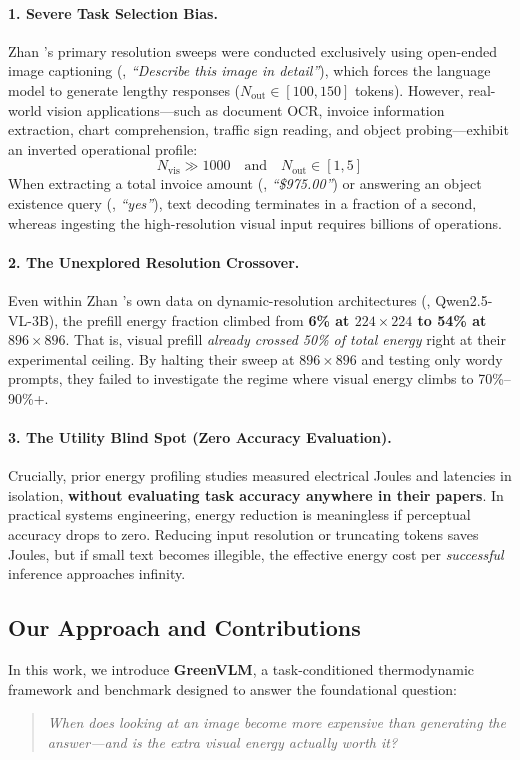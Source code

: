 \paragraph{1. Severe Task Selection Bias.}
Zhan \etal's primary resolution sweeps were conducted exclusively using open-ended image captioning (\eg, \emph{``Describe this image in detail''}), which forces the language model to generate lengthy responses ($N_{\text{out}} \in [100, 150]$ tokens). However, real-world vision applications---such as document OCR, invoice information extraction, chart comprehension, traffic sign reading, and object probing---exhibit an inverted operational profile:
\begin{equation}
    N_{\text{vis}} \gg 1000 \quad \text{and} \quad N_{\text{out}} \in [1, 5]
\end{equation}
When extracting a total invoice amount (\eg, \emph{``\$975.00''}) or answering an object existence query (\eg, \emph{``yes''}), text decoding terminates in a fraction of a second, whereas ingesting the high-resolution visual input requires billions of operations.

\paragraph{2. The Unexplored Resolution Crossover.}
Even within Zhan \etal's own data on dynamic-resolution architectures (\eg, Qwen2.5-VL-3B), the prefill energy fraction climbed from \textbf{6\% at $224\times 224$ to 54\% at $896\times 896$}. That is, visual prefill \emph{already crossed 50\% of total energy} right at their experimental ceiling. By halting their sweep at $896\times 896$ and testing only wordy prompts, they failed to investigate the regime where visual energy climbs to 70\%--90\%+.

\paragraph{3. The Utility Blind Spot (Zero Accuracy Evaluation).}
Crucially, prior energy profiling studies measured electrical Joules and latencies in isolation, \textbf{without evaluating task accuracy anywhere in their papers}. In practical systems engineering, energy reduction is meaningless if perceptual accuracy drops to zero. Reducing input resolution or truncating tokens saves Joules, but if small text becomes illegible, the effective energy cost per \emph{successful} inference approaches infinity.

\subsection{Our Approach and Contributions}
In this work, we introduce \textbf{GreenVLM}, a task-conditioned thermodynamic framework and benchmark designed to answer the foundational question:
\begin{quote}
\centering
\emph{When does looking at an image become more expensive than generating the answer---and is the extra visual energy actually worth it?}
\end{quote}

